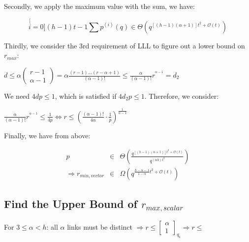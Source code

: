 Secondly, we apply the maximum value with the sum, we have:

\[
\stackrel[i=0]{(h-1)t-1}{\mathop{\sum}}p^{(i)}(q)\in\Theta\left(q^{\left[\left(h-1\right)\left(\alpha+1\right)\right]t^{2}+\mathcal{O}(t)}\right)
\]

Thirdly, we consider the 3rd requirement of LLL to figure out a lower
bound on $r_{max}$:

$d\leq\alpha\left(\begin{array}{c}
r-1\\
\alpha-1
\end{array}\right)=\alpha\frac{\left(r-1\right)\ldots\left(r-\alpha+1\right)}{\left(\alpha-1\right)!}\leq\frac{\alpha}{\left(\alpha-1\right)!}r^{^{\alpha-1}}=d_{2}$

We need $4dp\leq1$, which is satisfied if $4d_{2}p\leq1$. Therefore,
we consider:

$\frac{\alpha}{\left(\alpha-1\right)!}r^{^{\alpha-1}}\leq\frac{1}{4p}\Leftrightarrow r\leq\left(\frac{\left(\alpha-1\right)!}{4\alpha}\cdot\frac{1}{p}\right)^{\frac{1}{\alpha-1}}$

Finally, we have from above:

\begin{eqnarray*}
p & \in & \Theta\left(\frac{q^{\left[\left(h-1\right)\left(\alpha+1\right)\right]t^{2}+\mathcal{O}(t)}}{q^{\left(\alpha h\right)t^{2}}}\right)\\
\Rightarrow r_{min,vector} & \in & \Omega\left(q^{\frac{h-\alpha-1}{1-\alpha}t^{2}+\mathcal{O}(t)}\right)
\end{eqnarray*}


\subsection{Find the Upper Bound of $r_{max,scalar}$}

\noindent{}

For $3\leq\alpha<h$: all $\alpha$ links must be distinct $\Rightarrow r\leq\left[\begin{array}{c}
\alpha\\
1
\end{array}\right]_{q_{\mathrm{s}}}\Rightarrow r\leq$

